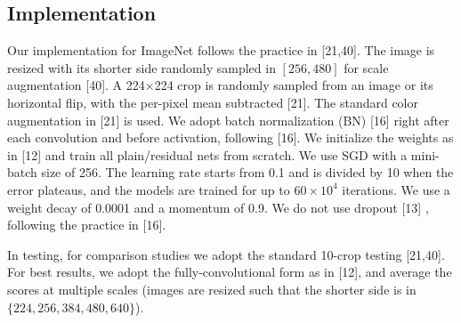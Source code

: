 
\subsection{Implementation}
\label{sec:impl}

Our implementation for ImageNet follows the practice in [21,40]. The image is resized with its shorter side randomly sampled in $[256, 480]$ for scale augmentation [40]. A 224$\times$224 crop is randomly sampled from an image or its horizontal flip, with the per-pixel mean subtracted [21]. The standard color augmentation in [21] is used.
We adopt batch normalization (BN) [16] right after each convolution and before activation, following [16].
We initialize the weights as in [12] and train all plain/residual nets from scratch.
We use SGD with a mini-batch size of 256. The learning rate starts from 0.1 and is divided by 10 when the error plateaus, and the models are trained for up to $60\times10^4$ iterations. We use a weight decay of 0.0001 and a momentum of 0.9. We do not use dropout [13] , following the practice in [16].

In testing, for comparison studies we adopt the standard 10-crop testing [21,40].
For best results, we adopt the fully-convolutional form as in [12], and average the scores at multiple scales (images are resized such that the shorter side is in $\{224, 256, 384, 480, 640\}$).




